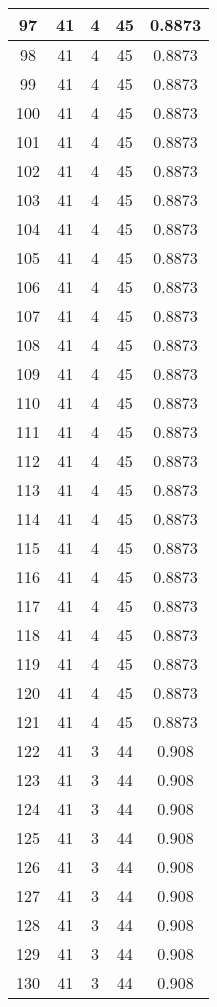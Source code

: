 \documentclass[letterpaper, 12pt]{article}
\begin{document}
\begin{longtable}{|c|c|c|c|c|}
\hline
97 & 41 & 4 & 45 & 0.8873 \\
\hline
98 & 41 & 4 & 45 & 0.8873 \\
\hline
99 & 41 & 4 & 45 & 0.8873 \\
\hline
100 & 41 & 4 & 45 & 0.8873 \\
\hline
101 & 41 & 4 & 45 & 0.8873 \\
\hline
102 & 41 & 4 & 45 & 0.8873 \\
\hline
103 & 41 & 4 & 45 & 0.8873 \\
\hline
104 & 41 & 4 & 45 & 0.8873 \\
\hline
105 & 41 & 4 & 45 & 0.8873 \\
\hline
106 & 41 & 4 & 45 & 0.8873 \\
\hline
107 & 41 & 4 & 45 & 0.8873 \\
\hline
108 & 41 & 4 & 45 & 0.8873 \\
\hline
109 & 41 & 4 & 45 & 0.8873 \\
\hline
110 & 41 & 4 & 45 & 0.8873 \\
\hline
111 & 41 & 4 & 45 & 0.8873 \\
\hline
112 & 41 & 4 & 45 & 0.8873 \\
\hline
113 & 41 & 4 & 45 & 0.8873 \\
\hline
114 & 41 & 4 & 45 & 0.8873 \\
\hline
115 & 41 & 4 & 45 & 0.8873 \\
\hline
116 & 41 & 4 & 45 & 0.8873 \\
\hline
117 & 41 & 4 & 45 & 0.8873 \\
\hline
118 & 41 & 4 & 45 & 0.8873 \\
\hline
119 & 41 & 4 & 45 & 0.8873 \\
\hline
120 & 41 & 4 & 45 & 0.8873 \\
\hline
121 & 41 & 4 & 45 & 0.8873 \\
\hline
122 & 41 & 3 & 44 & 0.908 \\
\hline
123 & 41 & 3 & 44 & 0.908 \\
\hline
124 & 41 & 3 & 44 & 0.908 \\
\hline
125 & 41 & 3 & 44 & 0.908 \\
\hline
126 & 41 & 3 & 44 & 0.908 \\
\hline
127 & 41 & 3 & 44 & 0.908 \\
\hline
128 & 41 & 3 & 44 & 0.908 \\
\hline
129 & 41 & 3 & 44 & 0.908 \\
\hline
130 & 41 & 3 & 44 & 0.908 \\

\end{longtable}
\end{document}
